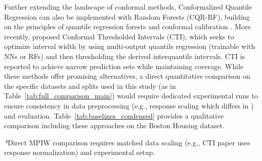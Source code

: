 \documentclass{article}
\begin{document}
Further extending the landscape of conformal methods, Conformalized Quantile Regression can also be implemented with Random Forests (CQR-RF), building on the principles of quantile regression forests \citep{Meinshausen2006} and conformal calibration \citep{Romano2019ConformalizedQR}. More recently, \citet{Luo2025CTI} proposed Conformal Thresholded Intervals (CTI), which seeks to optimize interval width by using multi-output quantile regression (trainable with NNs or RFs) and then thresholding the derived interquantile intervals. CTI is reported to achieve narrow prediction sets while maintaining coverage. While these methods offer promising alternatives, a direct quantitative comparison on the specific datasets and splits used in this study (as in Table~\ref{tab:full_comparison_main}) would require dedicated experimental runs to ensure consistency in data preprocessing (e.g., response scaling which differs in \citep{Luo2025CTI}) and evaluation. Table~\ref{tab:baselines_condensed} provides a qualitative comparison including these approaches on the Boston Housing dataset.

\begin{table}[h!]
\centering
\caption{Comparison with other baseline PI methods on Boston Housing (90\% nominal coverage).}
\label{tab:baselines_condensed}
\footnotesize{\textit{*}Direct MPIW comparison requires matched data scaling (e.g., CTI paper uses response normalization) and experimental setup.}
\end{table}
\end{document}

